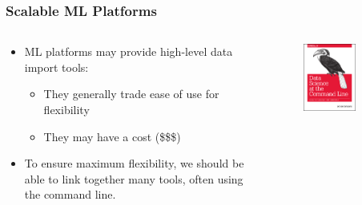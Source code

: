 \documentclass[hyperref={pdfpagelabels=true}]{beamer}
\begin{document}
\begin{frame}
\frametitle{Scalable ML Platforms}
\begin{columns}
  \begin{column}{0.5\textwidth}
  \begin{itemize}
    \item<1->ML platforms may provide high-level data import tools:
    \begin{itemize}
      \item<2->They generally trade ease of use for flexibility %
      \item<3->They may have a cost (\$\$\$) %
    \end{itemize}    
    \item<4->To ensure maximum flexibility, we should be able to link together many tools, often using the command line. 
  \end{itemize}   
  \end{column}
  \begin{column}{0.5\textwidth}
      \begin{figure}  
	\includegraphics[width=0.7\textwidth]{data-science-at-the-command-line.png}
       \end{figure}  
  \end{column}
\end{columns}
\end{frame}
\end{document}
